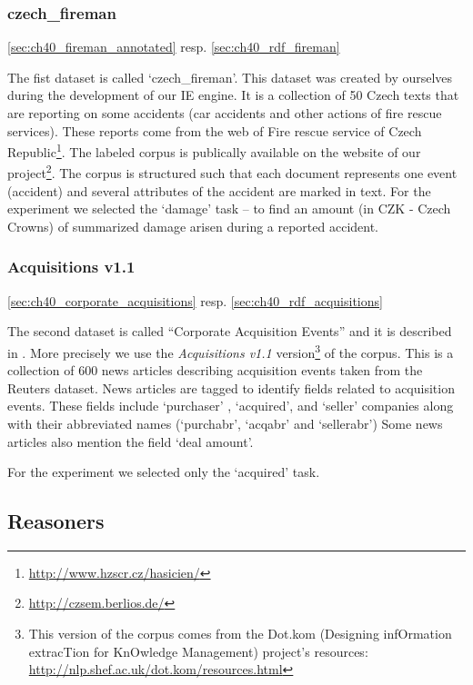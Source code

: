 \subsubsection{czech\_fireman}

\ref{sec:ch40_fireman_annotated} resp. \ref{sec:ch40_rdf_fireman}


The fist dataset is called `czech\_fireman'. This dataset was created by ourselves during the development of our IE  engine. It is a collection of 50 Czech texts that are reporting on some accidents (car accidents and other actions of fire rescue services). These reports come from the web of Fire rescue service of Czech Republic\footnote{\url{http://www.hzscr.cz/hasicien/}}. The labeled corpus is publically available on the website of our project\footnote{\url{http://czsem.berlios.de/}}.
The corpus is structured such that each document represents one event (accident) and several attributes of the accident are marked in text. For the experiment we selected the `damage' task -- to find an amount (in CZK - Czech Crowns) of summarized damage arisen during a reported accident.





\subsubsection{Acquisitions v1.1}  

\ref{sec:ch40_corporate_acquisitions} resp. \ref{sec:ch40_rdf_acquisitions}

The second dataset is called ``Corporate Acquisition Events'' and it is
described in \citep{lewis1992representation}. More precisely we use the \emph{Acquisitions v1.1} version\footnote{This version of the corpus comes from the Dot.kom (Designing infOrmation extracTion for KnOwledge Management) project's resources: \url{http://nlp.shef.ac.uk/dot.kom/resources.html}} of the corpus.
This is a collection of 600 news articles describing acquisition
events taken from the Reuters dataset. News articles are tagged to identify fields
related to acquisition events. These fields include `purchaser' , `acquired', and
`seller' companies along with their abbreviated names (`purchabr', `acqabr' and
`sellerabr') Some news articles also mention the field `deal amount'.


For the experiment we selected only the `acquired' task.





\subsection{Reasoners}

